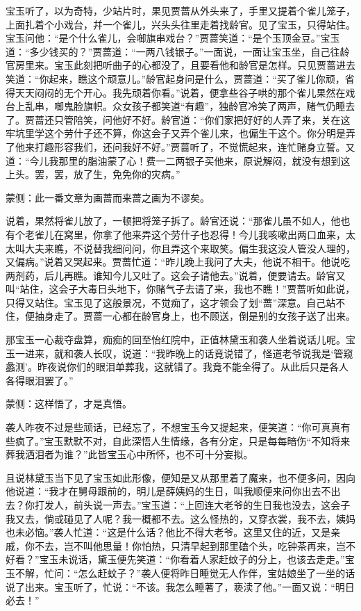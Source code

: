 \begin{parag}
    宝玉听了，以为奇特，少站片时，果见贾蔷从外头来了，手里又提着个雀儿笼子，上面扎着个小戏台，幷一个雀儿，兴头头往里走着找龄官。见了宝玉，只得站住。宝玉问他：“是个什么雀儿，会啣旗串戏台？”贾蔷笑道：“是个玉顶金豆。”宝玉道：“多少钱买的？”贾蔷道：“一两八钱银子。”一面说，一面让宝玉坐，自己往龄官房里来。宝玉此刻把听曲子的心都没了，且要看他和龄官是怎样。只见贾蔷进去笑道：“你起来，瞧这个顽意儿。”龄官起身问是什么，贾蔷道：“买了雀儿你顽，省得天天闷闷的无个开心。我先顽着你看。”说着，便拿些谷子哄的那个雀儿果然在戏台上乱串，啣鬼脸旗帜。众女孩子都笑道“有趣”，独龄官冷笑了两声，赌气仍睡去了。贾蔷还只管陪笑，问他好不好。龄官道：“你们家把好好的人弄了来，关在这牢坑里学这个劳什子还不算，你这会子又弄个雀儿来，也偏生干这个。你分明是弄了他来打趣形容我们，还问我好不好。”贾蔷听了，不觉慌起来，连忙赌身立誓。又道：“今儿我那里的脂油蒙了心！费一二两银子买他来，原说解闷，就没有想到这上头。罢，罢，放了生，免免你的灾病。”\begin{note}蒙侧：此一番文章为画蔷而来蔷之画为不谬矣。\end{note}说着，果然将雀儿放了，一顿把将笼子拆了。龄官还说：“那雀儿虽不如人，他也有个老雀儿在窝里，你拿了他来弄这个劳什子也忍得！今儿我咳嗽出两口血来，太太叫大夫来瞧，不说替我细问问，你且弄这个来取笑。偏生我这没人管没人理的，又偏病。”说着又哭起来。贾蔷忙道：“昨儿晚上我问了大夫，他说不相干。他说吃两剂药，后儿再瞧。谁知今儿又吐了。这会子请他去。”说着，便要请去。龄官又叫“站住，这会子大毒日头地下，你赌气子去请了来，我也不瞧！”贾蔷听如此说，只得又站住。宝玉见了这般景况，不觉痴了，这才领会了划“蔷”深意。自己站不住，便抽身走了。贾蔷一心都在龄官身上，也不顾送，倒是别的女孩子送了出来。
\end{parag}


\begin{parag}
    那宝玉一心裁夺盘算，痴痴的回至怡红院中，正值林黛玉和袭人坐着说话儿呢。宝玉一进来，就和袭人长叹，说道：“我昨晚上的话竟说错了，怪道老爷说我是‘管窥蠡测’。昨夜说你们的眼泪单葬我，这就错了。我竟不能全得了。从此后只是各人各得眼泪罢了。”\begin{note}蒙侧：这样悟了，才是真悟。\end{note}袭人昨夜不过是些顽话，已经忘了，不想宝玉今又提起来，便笑道：“你可真真有些疯了。”宝玉默默不对，自此深悟人生情缘，各有分定，只是每每暗伤“不知将来葬我洒泪者为谁？”此皆宝玉心中所怀，也不可十分妄拟。
\end{parag}


\begin{parag}
    且说林黛玉当下见了宝玉如此形像，便知是又从那里着了魔来，也不便多问，因向他说道：“我才在舅母跟前的，明儿是薛姨妈的生日，叫我顺便来问你出去不出去？你打发人，前头说一声去。”宝玉道：“上回连大老爷的生日我也没去，这会子我又去，倘或碰见了人呢？我一概都不去。这么怪热的，又穿衣裳，我不去，姨妈也未必恼。”袭人忙道：“这是什么话？他比不得大老爷。这里又住的近，又是亲戚，你不去，岂不叫他思量！你怕热，只清早起到那里磕个头，吃钟茶再来，岂不好看？”宝玉未说话，黛玉便先笑道：“你看着人家赶蚊子的分上，也该去走走。”宝玉不解，忙问：“怎么赶蚊子？”袭人便将昨日睡觉无人作伴，宝姑娘坐了一坐的话说了出来。宝玉听了，忙说：“不该。我怎么睡著了，亵渎了他。”一面又说：“明日必去！”
\end{parag}


